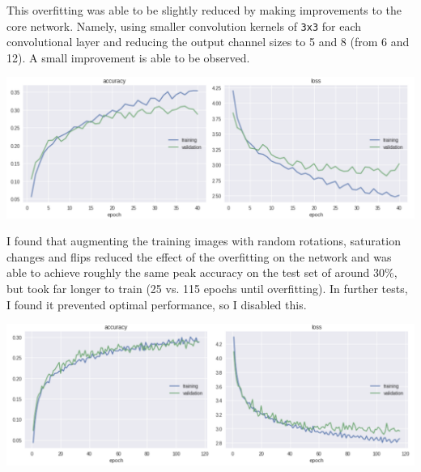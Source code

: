 \documentclass[11pt]{article}
\begin{document}
This overfitting was able to be slightly reduced by making improvements to the core network. Namely, using smaller convolution kernels of \texttt{3x3} for each convolutional layer and reducing the output channel sizes to 5 and 8 (from 6 and 12). A small improvement is able to be observed.

   \begin{center}
        \begin{minipage}{0.75\linewidth}
            \includegraphics[width=\linewidth]{accuracy4}
            \label{fig:first-conv}
        \end{minipage}%
    \end{center}
    
I found that augmenting the training images with random rotations, saturation changes and flips reduced the effect of the overfitting on the network and was able to achieve roughly the same peak accuracy on the test set of around 30\%, but took far longer to train (25 vs. 115 epochs until overfitting). In further tests, I found it prevented optimal performance, so I disabled this.

   \begin{center}
        \begin{minipage}{0.75\linewidth}
            \includegraphics[width=\linewidth]{accuracy5}
            \label{fig:first-conv}
        \end{minipage}%
    \end{center}
    
\end{document}
